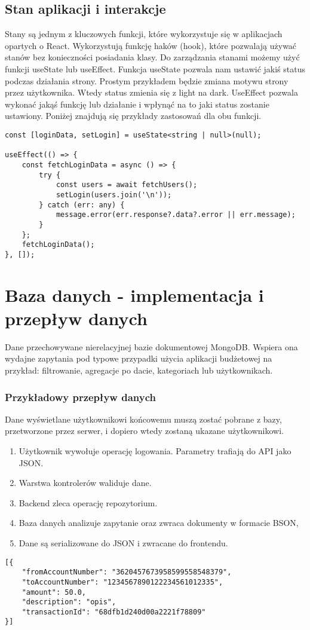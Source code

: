\subsection*{Stan aplikacji i interakcje}
Stany są jednym z kluczowych funkcji, które wykorzystuje się w aplikacjach opartych o React. Wykorzystują funkcję haków (hook), które pozwalają używać stanów bez konieczności posiadania klasy. Do zarządzania stanami możemy użyć funkcji useState lub useEffect. Funkcja useState pozwala nam ustawić jakiś status podczas działania strony. Prostym przykładem będzie zmiana motywu strony przez użytkownika. Wtedy status zmienia się z light na dark. UseEffect pozwala wykonać jakąś funkcję lub działanie i wpłynąć na to jaki status zostanie ustawiony. Poniżej znajdują się przykłady zastosowań dla obu funkcji.
\begin{lstlisting}[caption={Wykorzystanie stanów}, label={lst:TS-states}]
const [loginData, setLogin] = useState<string | null>(null);
	
useEffect(() => {
	const fetchLoginData = async () => {
		try {
			const users = await fetchUsers();
			setLogin(users.join('\n'));
		} catch (err: any) {
			message.error(err.response?.data?.error || err.message);
		}
	};
	fetchLoginData();
}, []);
\end{lstlisting}
\section{Baza danych - implementacja i przepływ danych}
Dane przechowywane nierelacyjnej bazie dokumentowej MongoDB. Wspiera ona wydajne zapytania pod typowe przypadki użycia aplikacji budżetowej na przykład: filtrowanie, agregacje po dacie, kategoriach lub użytkownikach. 
\subsubsection*{Przykładowy przepływ danych}
Dane wyświetlane użytkownikowi końcowemu muszą zostać pobrane z bazy, przetworzone przez serwer, i dopiero wtedy zostaną ukazane użytkownikowi. 
\begin{enumerate}
	\item Użytkownik wywołuje operację logowania. Parametry trafiają do API jako JSON.
	\item Warstwa kontrolerów waliduje dane. 
	\item Backend zleca operację repozytorium.
	\item Baza danych analizuje zapytanie oraz zwraca dokumenty w formacie BSON,
	\item Dane są serializowane do JSON i zwracane do frontendu.
\end{enumerate}
\begin{lstlisting}[caption={Przykładowe dane zwracane z bazy}, label={lst:TS-service1}]
[{
	"fromAccountNumber": "3620457673958599558548379",
	"toAccountNumber": "1234567890122234561012335",
	"amount": 50.0,
	"description": "opis",
	"transactionId": "68dfb1d240d00a2221f78809"
}]
\end{lstlisting}
